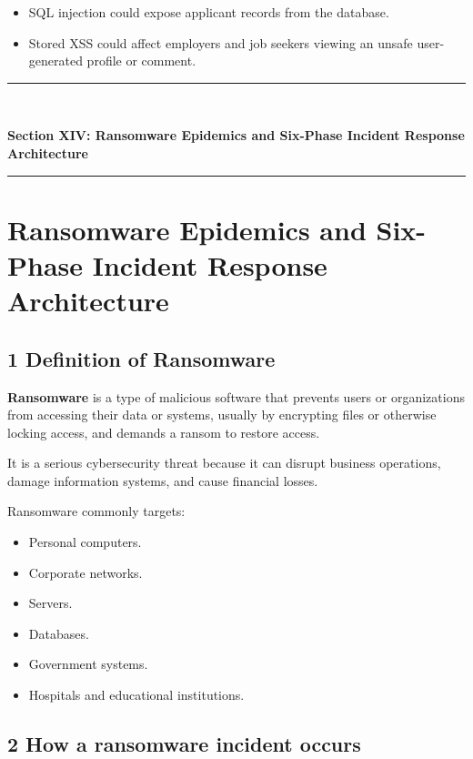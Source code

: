 \begin{itemize}
\item SQL injection could expose applicant records from the database.
\item Stored XSS could affect employers and job seekers viewing an unsafe user-generated profile or comment.
\end{itemize}


\newpage
\begin{center}
\vspace{0.5em}
{\color{primary}\rule{0.45\textwidth}{1.2pt}\\[4pt]}
{\Large\bfseries\color{primary} Section XIV: Ransomware Epidemics and Six-Phase Incident Response Architecture\\[2pt]}
{\color{primary}\rule{0.45\textwidth}{1.2pt}}
\vspace{0.5em}
\end{center}

\section{Ransomware Epidemics and Six-Phase Incident Response Architecture}


\subsection{1 Definition of Ransomware}

\textbf{Ransomware} is a type of malicious software that prevents users or organizations from accessing their data or systems, usually by encrypting files or otherwise locking access, and demands a ransom to restore access.

It is a serious cybersecurity threat because it can disrupt business operations, damage information systems, and cause financial losses.

Ransomware commonly targets:

\begin{itemize}
\item Personal computers.
\item Corporate networks.
\item Servers.
\item Databases.
\item Government systems.
\item Hospitals and educational institutions.
\end{itemize}

\subsection{2 How a ransomware incident occurs}

